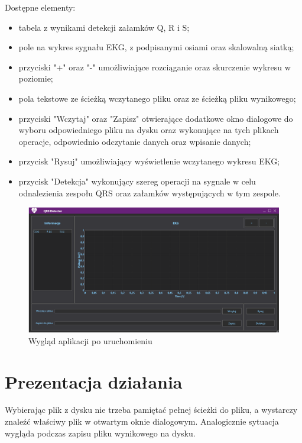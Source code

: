 \documentclass[11pt]{report}
\begin{document}
	Dostępne elementy:
	\begin{itemize}
		\item tabela z wynikami detekcji załamków Q, R i S;
		\item pole na wykres sygnału EKG, z podpisanymi osiami oraz skalowalną siatką;
		\item przyciski "+" oraz "-" umożliwiające rozciąganie oraz skurczenie wykresu w poziomie;
		\item pola tekstowe ze ścieżką wczytanego pliku oraz ze ścieżką pliku wynikowego;
		\item przyciski "Wczytaj" oraz "Zapisz" otwierające dodatkowe okno dialogowe do wyboru odpowiedniego pliku na dysku oraz wykonujące na tych plikach operacje, odpowiednio odczytanie danych oraz wpisanie danych;
		\item przycisk "Rysuj" umożliwiający wyświetlenie wczytanego wykresu EKG;
		\item przycisk "Detekcja" wykonujący szereg operacji na sygnale w celu odnalezienia zespołu QRS oraz załamków występujących w tym zespole.
	\end{itemize}
	
	\begin{figure} [H]
		\centering
		\includegraphics[width=1\linewidth]{GUI.png}
		\caption{Wygląd aplikacji po uruchomieniu}
		\label{fig:GUI}
	\end{figure}
	\vspace{2cm}

	\chapter{Prezentacja działania}
	Wybierając plik z dysku nie trzeba pamiętać pełnej ścieżki do pliku, a wystarczy znaleźć właściwy plik w otwartym oknie dialogowym. Analogicznie sytuacja wygląda podczas zapisu pliku wynikowego na dysku.
	
\end{document}
